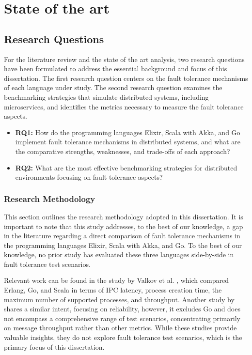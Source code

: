 \chapter{State of the art} 
\label{chap:State}

%
\section{Research Questions}

For the literature review and the state of the art analysis, two research questions have been formulated to address the essential background and focus of this dissertation. The first research question centers on the fault tolerance mechanisms of each language under study. The second research question examines the benchmarking strategies that simulate distributed systems, including microservices, and identifies the metrics necessary to measure the fault tolerance aspects.

\begin{itemize}
    \item \textbf{RQ1:} How do the programming languages Elixir, Scala with Akka, and Go implement fault tolerance mechanisms in distributed systems, and what are the comparative strengths, weaknesses, and trade-offs of each approach?
    \item \textbf{RQ2:} What are the most effective benchmarking strategies for distributed environments focusing on fault tolerance aspects?
\end{itemize}

\subsection{Research Methodology}

This section outlines the research methodology adopted in this dissertation. It is important to note that this study addresses, to the best of our knowledge, a gap in the literature regarding a direct comparison of fault tolerance mechanisms in the programming languages Elixir, Scala with Akka, and Go. To the best of our knowledge, no prior study has evaluated these three languages side-by-side in fault tolerance test scenarios.

Relevant work can be found in the study by Valkov et al. \cite{Valkov2018}, which compared Erlang, Go, and Scala in terms of \gls{IPC} latency, process creation time, the maximum number of supported processes, and throughput. Another study by \textcite{Randtoul2022} shares a similar intent, focusing on reliability, however, it excludes Go and does not encompass a comprehensive range of test scenarios, concentrating primarily on message throughput rather than other metrics. While these studies provide valuable insights, they do not explore fault tolerance test scenarios, which is the primary focus of this dissertation.

